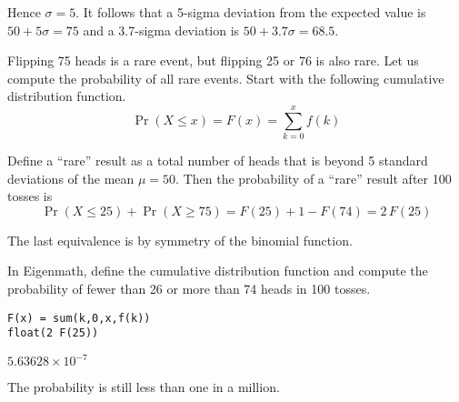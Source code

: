 Hence $\sigma=5$.
It follows that a 5-sigma deviation from the expected value is
$50+5\sigma=75$ and a
3.7-sigma deviation is $50+3.7\sigma=68.5$.

\bigskip
Flipping 75 heads is a rare event, but flipping 25 or 76 is also rare.
Let us compute the probability of all rare events.
Start with the following cumulative distribution function.
\begin{equation*}
\Pr(X\le x)=F(x)=\sum_{k=0}^xf(k)
\end{equation*}

Define a ``rare'' result as a total number of heads that is beyond 5 standard deviations of the
mean $\mu=50$.
Then the probability of a ``rare'' result after 100 tosses is
\begin{equation*}
\Pr(X\le25)+\Pr(X\ge75)=F(25)+1-F(74)=2\,F(25)
\end{equation*}

The last equivalence is by symmetry of the binomial function.

\bigskip
In Eigenmath, define the cumulative distribution function and compute the probability
of fewer than 26 or more than 74 heads in 100 tosses.

{\color{blue}
\begin{verbatim}
F(x) = sum(k,0,x,f(k))
float(2 F(25))
\end{verbatim}}

$5.63628\times10^{-7}$

\bigskip
The probability is still less than one in a million.


